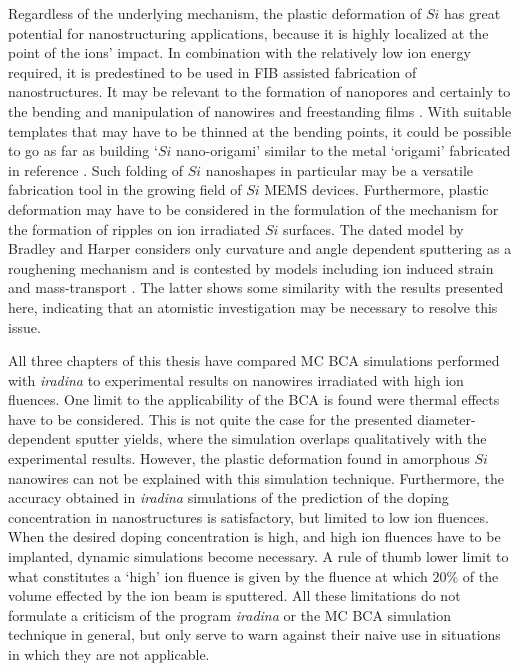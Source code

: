 Regardless of the underlying mechanism, the plastic deformation of $Si$ has great potential for nanostructuring applications, because it is highly localized at the point of the ions' impact. In combination with the relatively low ion energy required, it is predestined to be used in FIB assisted fabrication of nanostructures. It may be relevant to the formation of nanopores \cite{george_nanopore_2010} and certainly to the bending and manipulation of nanowires \cite{cui_ion-beam-induced_2013} and freestanding films \cite{kim_focused_2006}. With suitable templates that may have to be thinned at the bending points, it could be possible to go as far as building `$Si$ nano-origami' similar to the metal `origami' fabricated in reference \cite{chalapat_self-organized_2013}. Such folding of $Si$ nanoshapes in particular may be a versatile fabrication tool in the growing field of $Si$ MEMS devices. Furthermore, plastic deformation may have to be considered in the formulation of the mechanism for the formation of ripples on ion irradiated $Si$ surfaces. The dated model by Bradley and Harper \cite{bradley_theory_1988} considers only curvature and angle dependent sputtering as a roughening mechanism and is contested by models including ion induced strain and mass-transport \cite{norris_stress-induced_2012,kramczynski_wavelength-dependent_2014}. The latter shows some similarity with the results presented here, indicating that an atomistic investigation may be necessary to resolve this issue.

All three chapters of this thesis have compared MC BCA simulations performed with \emph{iradina} to experimental results on nanowires irradiated with high ion fluences. One limit to the applicability of the BCA is found were thermal effects have to be considered. This is not quite the case for the presented diameter-dependent sputter yields, where the simulation overlaps qualitatively with the experimental results. However, the plastic deformation found in amorphous $Si$ nanowires can not be explained with this simulation technique. Furthermore, the accuracy obtained in \emph{iradina} simulations of the prediction of the doping concentration in nanostructures is satisfactory, but limited to low ion fluences. When the desired doping concentration is high, and high ion fluences have to be implanted, dynamic simulations become necessary. A rule of thumb lower limit to what constitutes a `high' ion fluence is given by the fluence at which $20\%$ of the volume effected by the ion beam is sputtered. All these limitations do not formulate a criticism of the program \emph{iradina} or the MC BCA simulation technique in general, but only serve to warn against their naive use in situations in which they are not applicable.
 


